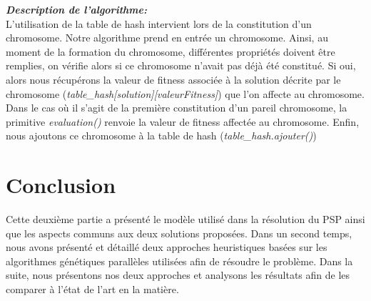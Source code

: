 	\vspace*{.3cm}
	\hspace*{.5cm} \textbf{\textsl{Description de l'algorithme:}}\\		
	\hspace*{.5cm} L'utilisation de la table de hash intervient lors de la constitution d'un chromosome. Notre algorithme prend en entrée un chromosome. Ainsi, au moment de la formation du chromosome, différentes propriétés doivent être remplies, on vérifie alors si ce chromosome n'avait pas déjà été constitué. Si oui, alors nous récupérons la valeur de fitness associée à la solution décrite par le chromosome (\emph{table\_hash[solution][valeurFitness]}) que l'on affecte au chromosome. Dans le cas où il s'agit de la première constitution d'un pareil chromosome, la primitive \emph{evaluation()} renvoie la valeur de fitness affectée au chromosome. Enfin, nous ajoutons ce chromosome à la table de hash (\emph{table\_hash.ajouter()})
	
	\section*{Conclusion}
	Cette deuxième partie a présenté le modèle utilisé dans la résolution du PSP ainsi que les aspects communs aux deux solutions proposées. Dans un second temps, nous avons présenté et détaillé deux approches heuristiques basées sur les algorithmes génétiques parallèles utilisées afin de résoudre le problème. Dans la suite, nous présentons nos deux approches et analysons les résultats afin de les comparer à l'état de l'art en la matière.
